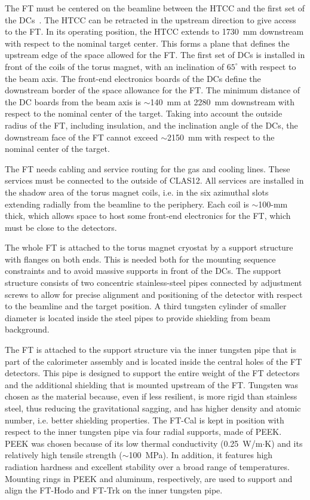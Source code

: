 The FT must be centered on the beamline between the HTCC and the first set of the DCs~\cite{dc}. The HTCC
can be retracted in the upstream direction to give access to the FT. In its operating position, the HTCC extends to
1730~mm downstream with respect to the nominal target center. This forms a plane that defines the upstream edge
of the space allowed for the FT. The first set of DCs is installed in front of the coils of the torus magnet, with an
inclination of $65^\circ$ with respect to the beam axis. The front-end electronics boards of the DCs define the
downstream border of the space allowance for the FT. The minimum distance of the DC boards from the beam axis
is $\sim$140~mm at 2280~mm downstream with respect to the nominal center of the target. Taking into account the
outside radius of the FT, including insulation, and the inclination angle of the DCs, the downstream face of the FT
cannot exceed $\sim$2150~mm with respect to the nominal center of the target.

The FT needs cabling and service routing for the gas and cooling lines. These services must be connected to the
outside of CLAS12. All services are installed in the shadow area of the torus magnet coils, i.e. in the six azimuthal
slots extending radially from the beamline to the periphery. Each coil is $\sim$100-mm thick, which allows space
to host some front-end electronics for the FT, which must be close to the detectors.

The whole FT is attached to the torus magnet cryostat by a support structure with flanges on both ends. This is
needed both for the mounting sequence constraints and to avoid massive supports in front of the DCs. The support
structure consists of two concentric stainless-steel pipes connected by adjustment screws to allow for precise
alignment and positioning of the detector with respect to the beamline and the target position. A third tungsten
cylinder of smaller diameter is located inside the steel pipes to provide shielding from beam background. 

The FT is attached to the support structure via the inner tungsten pipe that is part of the calorimeter assembly
and is located inside the central holes of the FT detectors. This pipe is designed to support the entire weight of the
FT detectors and the additional shielding that is mounted upstream of the FT. Tungsten was chosen as the material
because, even if less resilient, is more rigid than stainless steel, thus reducing the gravitational sagging, and has higher density and atomic number, i.e. better shielding properties. The FT-Cal
is kept in position with respect to the inner tungsten pipe via four radial supports, made of PEEK. PEEK was chosen
because of its low thermal conductivity (0.25~W/m$\cdot$K) and its relatively high tensile strength
($\sim$100~MPa). In addition, it features high radiation hardness and excellent stability over a broad range of
temperatures. Mounting rings in PEEK and aluminum, respectively, are used to support and align the FT-Hodo and
FT-Trk on the inner tungsten pipe.


